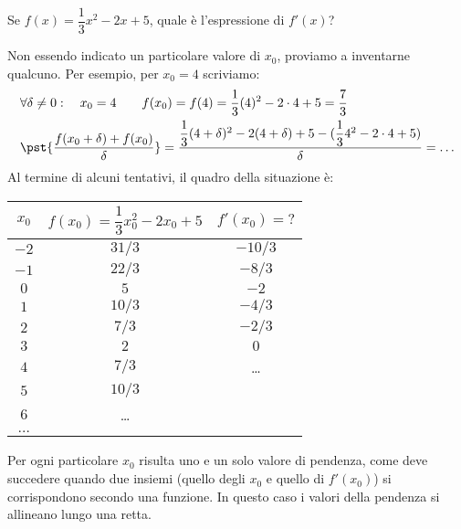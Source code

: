 \begin{esempio}
\label{esempio:esempio_5}
Se \(f(x)=\dfrac{1}{3}x^2-2x+5\), quale è l'espressione di \(f'(x)\)?
 
Non essendo indicato un particolare valore di \(x_0\), proviamo a inventarne 
qualcuno. Per esempio, per \(x_0=4\) scriviamo:
\begin{align*}
 &\forall \delta\ne 0:\quad x_0= 4\quad\quad 
f(x_0)=f(4)=\frac{1}{3}(4)^2-2\cdot 4+5 = \dfrac{7}{3}\\
&\pst{\dfrac{f(x_0+\delta)+f(x_0)}{\delta}}=
\dfrac{\dfrac{1}{3}(4+\delta)^2-2(4+\delta) + 5 - 
(\dfrac{1}{3}4^2-2\cdot 4+5)}{\delta}=\dots
\end{align*}
Al termine di alcuni tentativi, il quadro della situazione è:

 \begin{minipage}{0.48\textwidth}
 \begin{center}
\begin{tabular}{ccc}\toprule
\(x_0\) & \(f(x_0)=\dfrac{1}{3}x_0^2-2x_0+5\) & \(f'(x_0)=?\) \\\midrule
\(-2\) & \(31/3\) &  \(-10/3\)\\ 
\(-1\) & \(22/3\) &  \(-8/3\) \\
\(0\)  & \(5\)    & \(-2\)  \\
\(1\)  & \(10/3\) & \(-4/3\) \\
\(2\)  & \(7/3\)  & \(-2/3\)\\
\(3\)  & \(2\)    & \(0\)\\
\(4\)  & \(7/3\)  &\dots \\
\(5\)  & \(10/3\) \\
\(6\)  & \dots   \\
\(\dots\)  
\end{tabular}
\label{tab:derivataa}
\end{center}
\end{minipage}
 \hfill
\begin{minipage}{.48 \textwidth}
\begin{inaccessibleblock}
\begin{center} \scalebox{.7}{\funzioneederivata} \end{center}
\end{inaccessibleblock}
\label{graf:funzioneederivata}
\end{minipage}
\end{esempio}
Per ogni particolare \(x_0\) risulta uno e un solo valore di pendenza, come 
deve succedere quando due insiemi (quello degli \(x_0\) e quello di 
\(f'(x_0)\)) si corrispondono secondo una funzione. 
In questo caso i valori della pendenza si allineano lungo una retta.

